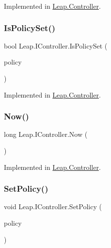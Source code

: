Implemented in \mbox{\hyperlink{class_leap_1_1_controller_ac8b0d112dcaa36505057f7787a0dedda}{Leap.\+Controller}}.

\mbox{\label{interface_leap_1_1_i_controller_abdb91a0a5278f41c91cb92e37854c27c}} 
\subsubsection{\texorpdfstring{IsPolicySet()}{IsPolicySet()}}
{\footnotesize\ttfamily bool Leap.\+I\+Controller.\+Is\+Policy\+Set (\begin{DoxyParamCaption}\item[{\mbox{\hyperlink{class_leap_1_1_controller_a0bdb49fa94aa2da8b098c1ac296528d6}{Controller.\+Policy\+Flag}}}]{policy }\end{DoxyParamCaption})}



Implemented in \mbox{\hyperlink{class_leap_1_1_controller_af0f85f9c36a57143107952afc26ec5d4}{Leap.\+Controller}}.

\mbox{\label{interface_leap_1_1_i_controller_a965ef8281ece6db686682378a71ce38c}} 
\subsubsection{\texorpdfstring{Now()}{Now()}}
{\footnotesize\ttfamily long Leap.\+I\+Controller.\+Now (\begin{DoxyParamCaption}{ }\end{DoxyParamCaption})}



Implemented in \mbox{\hyperlink{class_leap_1_1_controller_a57650944fa868adcfe4cea8608af5a03}{Leap.\+Controller}}.

\mbox{\label{interface_leap_1_1_i_controller_a12a90db07fb494e152cc937569ec77f0}} 
\subsubsection{\texorpdfstring{SetPolicy()}{SetPolicy()}}
{\footnotesize\ttfamily void Leap.\+I\+Controller.\+Set\+Policy (\begin{DoxyParamCaption}\item[{\mbox{\hyperlink{class_leap_1_1_controller_a0bdb49fa94aa2da8b098c1ac296528d6}{Controller.\+Policy\+Flag}}}]{policy }\end{DoxyParamCaption})}



